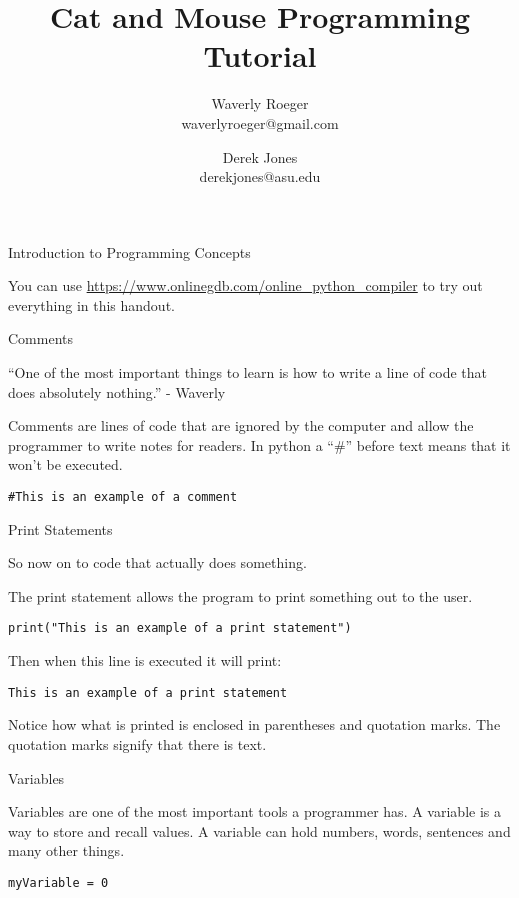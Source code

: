 \documentclass[12pt,oneside]{article}
\newcommand{\q}[1]{``#1''}
\newcommand{\subsectitle}[1]{
  \begin{flushleft}{\large#1}\end{flushleft}
}
\newcommand{\sectitlenonewpage}[1]{
  \begin{flushleft}{\huge#1}\end{flushleft}
}
\begin{document}
\title{Cat and Mouse Programming Tutorial}
\author{Waverly Roeger\\\normalsize waverlyroeger@gmail.com \and Derek Jones\\\normalsize derekjones@asu.edu}
\date{}

\maketitle

\sectitlenonewpage{Introduction to Programming Concepts}

You can use \url{https://www.onlinegdb.com/online_python_compiler} to try out everything in this handout.

\subsectitle{Comments}

\q{One of the most important things to learn is how to write a line of code that does absolutely nothing.} - Waverly

Comments are lines of code that are ignored by the computer and allow the programmer to write notes for readers. In python a \q{\#} before text means that it won't be executed.

\begin{lstlisting}
#This is an example of a comment
\end{lstlisting}

\subsectitle{Print Statements}

So now on to code that actually does something. 

The print statement allows the program to print something out to the user.

\begin{lstlisting}
print("This is an example of a print statement")
\end{lstlisting}

Then when this line is executed it will print:

\begin{lstlisting}
This is an example of a print statement
\end{lstlisting}

Notice how what is printed is enclosed in parentheses and quotation marks. The quotation marks signify that there is text. 

\subsectitle{Variables}

Variables are one of the most important tools a programmer has. A variable is a way to store and recall values. A variable can hold numbers, words, sentences and many other things. 


\begin{lstlisting}
myVariable = 0
\end{lstlisting}
\end{document}
